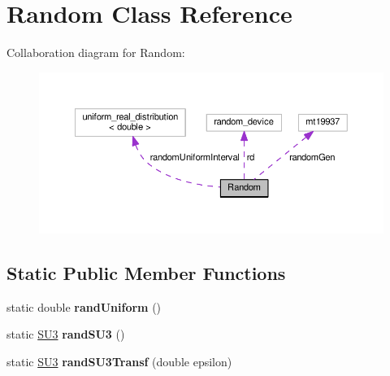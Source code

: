 \hypertarget{classRandom}{}\section{Random Class Reference}
\label{classRandom}


Collaboration diagram for Random\+:\nopagebreak
\begin{figure}[H]
\begin{center}
\leavevmode
\includegraphics[width=350pt]{dc/d73/classRandom__coll__graph}
\end{center}
\end{figure}
\subsection*{Static Public Member Functions}
\begin{DoxyCompactItemize}
\item 
static double {\bfseries rand\+Uniform} ()\hypertarget{classRandom_a85d1fc4b7dd6a2a659c02101a87f7a46}{}\label{classRandom_a85d1fc4b7dd6a2a659c02101a87f7a46}

\item 
static \hyperlink{structSU3}{S\+U3} {\bfseries rand\+S\+U3} ()\hypertarget{classRandom_ac5292fc838c1321ef8657947456a3970}{}\label{classRandom_ac5292fc838c1321ef8657947456a3970}

\item 
static \hyperlink{structSU3}{S\+U3} {\bfseries rand\+S\+U3\+Transf} (double epsilon)\hypertarget{classRandom_a1999be7abe21383e442a5ef96fe836f4}{}\label{classRandom_a1999be7abe21383e442a5ef96fe836f4}

\end{DoxyCompactItemize}
